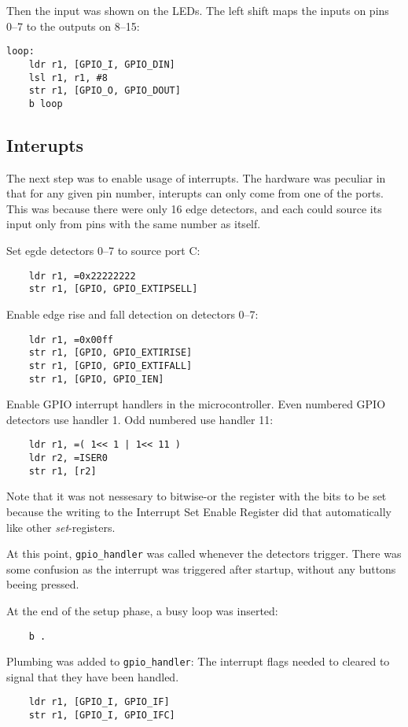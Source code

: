 Then the input was shown on the LEDs.
The left shift maps the inputs on pins 0--7 to the outputs on 8--15:
\begin{verbatim}
loop:
    ldr r1, [GPIO_I, GPIO_DIN]
    lsl r1, r1, #8
    str r1, [GPIO_O, GPIO_DOUT]
    b loop
\end{verbatim}


\subsection{Interupts}
The next step was to enable usage of interrupts.
The hardware was peculiar in that for any given pin number, interupts can only come from one of the ports.
This was because there were only 16 edge detectors, and each could source its input only from pins with the same number as itself.

Set egde detectors 0--7 to source port C:
\begin{verbatim}
    ldr r1, =0x22222222
    str r1, [GPIO, GPIO_EXTIPSELL]
\end{verbatim}

Enable edge rise and fall detection on detectors 0--7:
\begin{verbatim}
    ldr r1, =0x00ff
    str r1, [GPIO, GPIO_EXTIRISE]
    str r1, [GPIO, GPIO_EXTIFALL]
    str r1, [GPIO, GPIO_IEN]
\end{verbatim}

Enable GPIO interrupt handlers in the microcontroller.
Even numbered GPIO detectors use handler 1.
Odd numbered use handler 11:
\begin{verbatim}
    ldr r1, =( 1<< 1 | 1<< 11 )
    ldr r2, =ISER0
    str r1, [r2]
\end{verbatim}

Note that it was not nessesary to bitwise-or the register with the bits to be set because the writing to the Interrupt Set Enable Register did that automatically like other \emph{set}-registers.

At this point, \texttt{gpio\_handler} was called whenever the detectors trigger.
There was some confusion as the interrupt was triggered after startup, without any buttons beeing pressed.

At the end of the setup phase, a busy loop was inserted:
\begin{verbatim}
    b .
\end{verbatim}

Plumbing was added to \texttt{gpio\_handler}:
The interrupt flags needed to cleared to signal that they have been handled.
\begin{verbatim}
    ldr r1, [GPIO_I, GPIO_IF]
    str r1, [GPIO_I, GPIO_IFC]
\end{verbatim}

